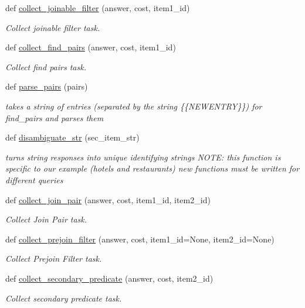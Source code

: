 \begin{DoxyCompactItemize}
def \mbox{\hyperlink{namespacejoinapp_1_1views__helpers_a113ceb6af057c8c69cd05bb609e05f09}{collect\+\_\+joinable\+\_\+filter}} (answer, cost, item1\+\_\+id)
\begin{DoxyCompactList}\small\item\em Collect joinable filter task. \end{DoxyCompactList}\item 
def \mbox{\hyperlink{namespacejoinapp_1_1views__helpers_a6226658bd9bc3aabc7b080290d636ace}{collect\+\_\+find\+\_\+pairs}} (answer, cost, item1\+\_\+id)
\begin{DoxyCompactList}\small\item\em Collect find pairs task. \end{DoxyCompactList}\item 
def \mbox{\hyperlink{namespacejoinapp_1_1views__helpers_ad2bdb254b14e8e7446c6c6579cc3c036}{parse\+\_\+pairs}} (pairs)
\begin{DoxyCompactList}\small\item\em takes a string of entries (separated by the string \{\{N\+E\+W\+E\+N\+T\+RY\}\}) for find\+\_\+pairs and parses them \end{DoxyCompactList}\item 
def \mbox{\hyperlink{namespacejoinapp_1_1views__helpers_ad080b70a78f91b79b90bbec5e960142d}{disambiguate\+\_\+str}} (sec\+\_\+item\+\_\+str)
\begin{DoxyCompactList}\small\item\em turns string responses into unique identifying strings N\+O\+TE\+: this function is specific to our example (hotels and restaurants) new functions must be written for different queries \end{DoxyCompactList}\item 
def \mbox{\hyperlink{namespacejoinapp_1_1views__helpers_a30d5f30811b2373f09a4bb38dabfba68}{collect\+\_\+join\+\_\+pair}} (answer, cost, item1\+\_\+id, item2\+\_\+id)
\begin{DoxyCompactList}\small\item\em Collect Join Pair task. \end{DoxyCompactList}\item 
def \mbox{\hyperlink{namespacejoinapp_1_1views__helpers_a24a97f8a3f6e60035249b2b382b353b0}{collect\+\_\+prejoin\+\_\+filter}} (answer, cost, item1\+\_\+id=None, item2\+\_\+id=None)
\begin{DoxyCompactList}\small\item\em Collect Prejoin Filter task. \end{DoxyCompactList}\item 
def \mbox{\hyperlink{namespacejoinapp_1_1views__helpers_af44e5e0c97dc944cf1229afb35ebf7df}{collect\+\_\+secondary\+\_\+predicate}} (answer, cost, item2\+\_\+id)
\begin{DoxyCompactList}\small\item\em Collect secondary predicate task. \end{DoxyCompactList}\end{DoxyCompactItemize}



